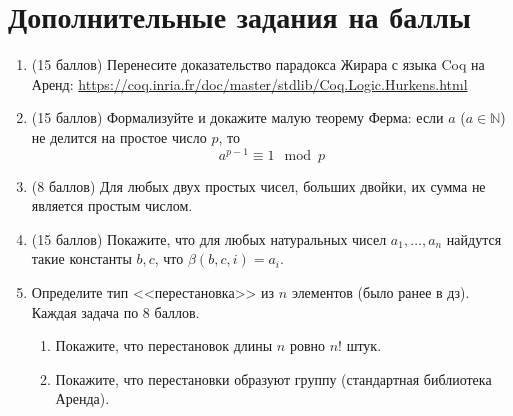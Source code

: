 \documentclass[10pt,a4paper,oneside]{article}
\begin{document}
\section*{Дополнительные задания на баллы}
\begin{enumerate}
\item (15 баллов) Перенесите доказательство парадокса Жирара с языка Coq на Аренд:
\url{https://coq.inria.fr/doc/master/stdlib/Coq.Logic.Hurkens.html}

\item (15 баллов) 
Формализуйте и докажите малую теорему Ферма: если $a$ ($a \in \mathbb{N}$) не делится на простое число $p$,
то $$a^{p-1} \equiv 1 \mod p$$ 

\item (8 баллов) Для любых двух простых чисел, больших двойки, их сумма не является простым числом.

\item (15 баллов) Покажите, что для любых натуральных чисел $a_1,\dots,a_n$ найдутся такие константы $b,c$, что $\beta(b,c,i) = a_i$.

\item Определите тип <<перестановка>> из $n$ элементов (было ранее в дз). Каждая задача по 8 баллов.
\begin{enumerate}
\item Покажите, что перестановок длины $n$ ровно $n!$ штук.
\item Покажите, что перестановки образуют группу (стандартная библиотека Аренда).
\end{enumerate}

\end{enumerate}
\end{document}

